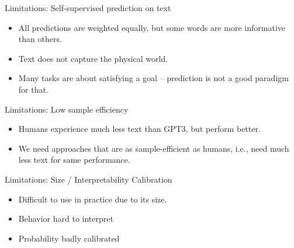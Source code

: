 
\begin{frame}{Limitations: Self-supervised prediction on text}

\vfill

  \begin{itemize}
\item All predictions are weighted equally, but some
words are more informative than others.
    \item Text does not capture the physical world.
\item Many tasks are about satisfying a goal --
prediction is not a good paradigm for that.
    \end{itemize}

\vfill

\end{frame}


\begin{frame}{Limitations: Low sample efficiency}

\vfill

  \begin{itemize}
    \item Humans experience much less text than GPT3, but
perform better.
    \item We  need approaches that are as
    sample-efficient as humans, i.e., need much less text
    for same performance.

    \end{itemize}

\vfill

\end{frame}


\begin{frame}{Limitations: Size / Interpretability Calibration}

\vfill

  \begin{itemize}
\item Difficult to use in practice due to its size.
    \item Behavior hard to interpret
    \item Probability badly calibrated
    \end{itemize}

\vfill

\end{frame}


